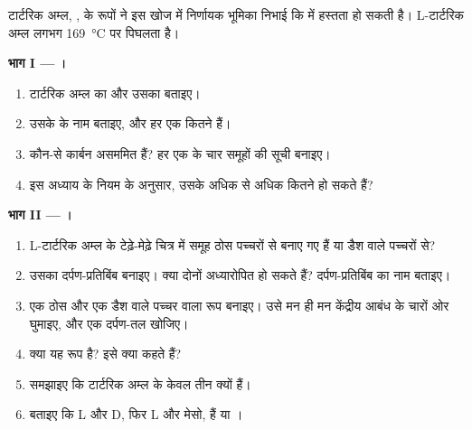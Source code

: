 \begin{problem}
\label{pb:g12:stereochemistry:1}
टार्टरिक अम्ल, , के रूपों ने इस खोज में
निर्णायक भूमिका निभाई कि  में हस्तता हो सकती है। L-टार्टरिक अम्ल लगभग \qty{169}{\celsius} पर पिघलता है।

\medskip
\noindent\textbf{भाग I --- ।}
\begin{enumerate}
  \item टार्टरिक अम्ल का  और उसका  बताइए।
  \item उसके  के नाम बताइए, और हर एक कितने हैं।
  \item कौन-से कार्बन  असममित हैं? हर एक के चार समूहों की सूची बनाइए।
  \item इस अध्याय के नियम के अनुसार, उसके अधिक से अधिक कितने 
        हो सकते हैं?
\end{enumerate}

\medskip
\noindent\textbf{भाग II --- ।}
\begin{enumerate}[resume]
  \item L-टार्टरिक अम्ल के टेढ़े-मेढ़े चित्र में  समूह
        ठोस पच्चरों से बनाए गए हैं या डैश वाले पच्चरों से?
  \item उसका दर्पण-प्रतिबिंब बनाइए। क्या दोनों अध्यारोपित हो सकते हैं? दर्पण-प्रतिबिंब
        का नाम बताइए।
  \item एक ठोस और एक डैश वाले पच्चर वाला रूप बनाइए। उसे मन ही मन केंद्रीय आबंध
        के चारों ओर घुमाइए, और एक दर्पण-तल खोजिए।
  \item क्या यह रूप  है? इसे क्या कहते हैं?
  \item समझाइए कि टार्टरिक अम्ल के केवल तीन  क्यों हैं।
  \item बताइए कि L और D, फिर L और मेसो,  हैं या
        ।
\end{enumerate}


\end{problem}
